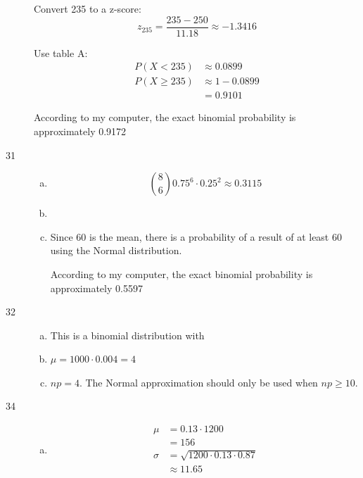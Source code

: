 \documentclass[letterpaper, landscape]{exam}
\begin{document}
\begin{description}
        Convert 235 to a z-score:
        \[
          z_{235} = \frac{235 - 250}{11.18} \approx -1.3416
        \]

        Use table A\@:
        \begin{align*}
          P(X < 235)    & \approx 0.0899 \\
          P(X \geq 235) & \approx 1 - 0.0899 \\
                        & = \boxed{ 0.9101 }
        \end{align*}

        According to my computer, the exact binomial probability is
        approximately 0.9172

      \item[31]
        \begin{enumerate}[(a)]
          \item 
            \[
              \binom{8}{6} 0.75^6 \cdot 0.25^2 \approx \boxed{ 0.3115 } 
            \]

          \item {}

          \item Since 60 is the mean, there is a  probability of a
            result of at least 60 using the Normal distribution.

            According to my computer, the exact binomial probability is
            approximately 0.5597

        \end{enumerate}

      \item[32]
        \begin{enumerate}[(a)]
          \item This is a binomial distribution with 

          \item $\mu = 1000 \cdot 0.004 = \boxed{ 4 }$

          \item $np = 4$. The Normal approximation should only be used when 
            $np \geq 10$.
        \end{enumerate}

      \item[34]
        \begin{enumerate}[(a)]
          \item
            \begin{align*}
              \mu    & = 0.13 \cdot 1200 \\
                     & = \boxed{ 156 } \\
              \sigma & = \sqrt{1200 \cdot 0.13 \cdot 0.87} \\
                     & \approx \boxed{ 11.65 } \\
            \end{align*}


\end{enumerate}
\end{description}
\end{document}
